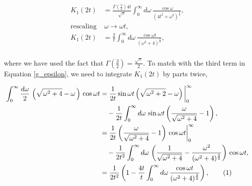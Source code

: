 \documentclass{article}
\numberwithin{equation}{section} %
\begin{document}
\begin{equation}
\begin{split}
K_1(2t) &= \frac{\Gamma(\frac{3}{2})4t}{\sqrt{\pi}} \int^\infty_0 d\omega\, 
\frac{\cos \omega }{(4t^2 + \omega^2)^{\frac{3}{2}}},\\
\mathrm{rescaling}\,&\, \omega \rightarrow \omega t,\\
K_1(2t) &=\frac{2}{t} \int^\infty_0 d\omega\, 
\frac{\cos \omega t}{(\omega^2+4)^{\frac{3}{2}}},\\
\end{split}
\label{K1}
\end{equation}

\noindent where we have used the fact that  $\Gamma(\frac{3}{2})=\frac{\sqrt{\pi}}{2}$. To match with the third term in Equation \ref{g_epsilon}, we need to integrate $K_1(2t)$ by parts twice,


\begin{align*}
\int^\infty_0 \frac{d\omega}{2}\, \left(\sqrt{\omega^2 + 4} - \omega\,\right)\, \cos \omega t &= \frac{1}{2t}\sin \omega t \left(\sqrt{\omega^2 +2} - \omega\right)\bigg\vert^\infty_0\\
& \quad -\frac{1}{2t}\int^\infty_0 d\omega\, \sin \omega t \left( \frac{\omega}{\sqrt{\omega^2 +4}} - 1 \right),\\
&=\frac{1}{2t}\left(\frac{\omega}{\sqrt{\omega^2+4}} -1 \right)\,\cos \omega t \bigg\vert^\infty_0 \\
 &\quad -\frac{1}{2t^2} \int^\infty_0 d\omega \, \left(\frac{1}{\sqrt{\omega^2 + 4}} - \frac{\omega^2}{(\omega^2 +4)^{\frac{3}{2}}} \right) \, \cos \omega t,\\
&=\frac{1}{2t^2} \left( 1 - \frac{4t}{t} \int^\infty_0 d\omega \, \frac{\cos \omega t}{(\omega^2 + 4)^{\frac{3}{2}}} \right),
\tag{\refstepcounter{equation}\theequation}
\end{align*}
\end{document}
